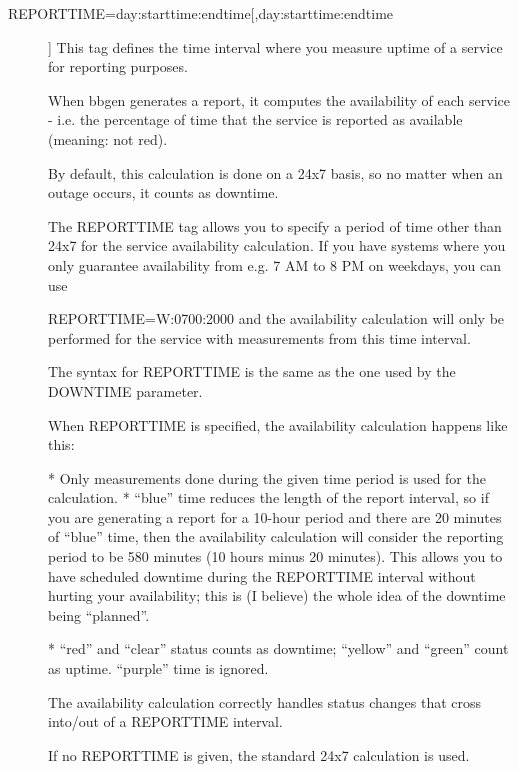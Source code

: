  \begin{description}
\item[REPORTTIME=day:starttime:endtime[,day:starttime:endtime]] This
  tag defines the time interval where you measure uptime of a service
  for reporting purposes. 


  When bbgen generates a report, it computes the availability of each
  service - i.e. the percentage of time that the service is reported
  as available (meaning: not red). 



  By default, this calculation is done on a 24x7 basis, so no matter
  when an outage occurs, it counts as downtime. 



  The REPORTTIME tag allows you to specify a period of time other than
  24x7 for the service availability calculation. If you have systems
  where you only guarantee availability from e.g. 7 AM to 8 PM on
  weekdays, you can use  

 
REPORTTIME=W:0700:2000  
 and the availability calculation will only be performed for the
 service with measurements from this time interval. 



  The syntax for REPORTTIME is the same as the one used by the DOWNTIME parameter. 


  When REPORTTIME is specified, the availability calculation happens like this: 


  * Only measurements done during the given time period is used for the calculation.  
 * ``blue'' time reduces the length of the report interval, so if you
 are generating a report for a 10-hour period and there are 20 minutes
 of ``blue'' time, then the availability calculation will consider the
 reporting period to be 580 minutes (10 hours minus 20 minutes). This
 allows you to have scheduled downtime during the REPORTTIME interval
 without hurting your availability; this is (I believe) the whole idea
 of the downtime being ``planned''.  

 * ``red'' and ``clear'' status counts as downtime; ``yellow'' and
   ``green'' count as uptime. ``purple'' time is ignored. 



  The availability calculation correctly handles status changes that cross into/out of a REPORTTIME interval. 


  If no REPORTTIME is given, the standard 24x7 calculation is used. 



\end{description}
